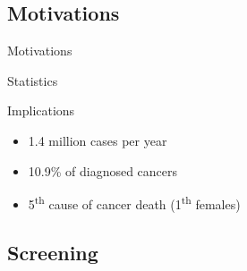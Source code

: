 \graphicspath{{chapters/introduction/figures/}}


\subsection{Motivations}

\begin{frame}{Motivations}
  \begin{block}{\small Statistics}
    \begin{figure}%
      \centering
      \hspace*{\fill}%
      \hfill%
        \hspace*{\fill}%
      \label{fig:stat1}%
    \end{figure}
  \end{block}
  \begin{block}{\small Implications}\footnotesize
    \begin{itemize}
      \item 1.4 million cases per year
      \item 10.9\% of diagnosed cancers
      \item 5\textsuperscript{th} cause of cancer death (1\textsuperscript{th} females)
    \end{itemize}
  \end{block}
\end{frame}

\subsection{Screening}

